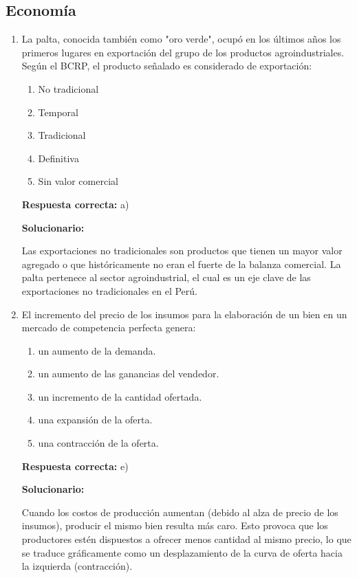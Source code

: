 \subsection*{Economía}

\begin{enumerate}[resume]

	\item La palta, conocida también como "oro verde", ocupó en los últimos años los primeros lugares en exportación del grupo de los productos agroindustriales. Según el BCRP, el producto señalado es considerado de exportación:
	\begin{enumerate}[label=\alph*)]
		\item No tradicional
		\item Temporal
		\item Tradicional
		\item Definitiva
		\item Sin valor comercial
	\end{enumerate}
	\textbf{Respuesta correcta:} a)

	\vspace{2mm}
	\textbf{Solucionario:}

	Las exportaciones no tradicionales son productos que tienen un mayor valor agregado o que históricamente no eran el fuerte de la balanza comercial. La palta pertenece al sector agroindustrial, el cual es un eje clave de las exportaciones no tradicionales en el Perú.

	\vspace{6mm}

	\item El incremento del precio de los insumos para la elaboración de un bien en un mercado de competencia perfecta genera:
	\begin{enumerate}[label=\alph*)]
		\item un aumento de la demanda.
		\item un aumento de las ganancias del vendedor.
		\item un incremento de la cantidad ofertada.
		\item una expansión de la oferta.
		\item una contracción de la oferta.
	\end{enumerate}
	\textbf{Respuesta correcta:} e)

	\vspace{2mm}
	\textbf{Solucionario:}

	Cuando los costos de producción aumentan (debido al alza de precio de los insumos), producir el mismo bien resulta más caro. Esto provoca que los productores estén dispuestos a ofrecer menos cantidad al mismo precio, lo que se traduce gráficamente como un desplazamiento de la curva de oferta hacia la izquierda (contracción).

	\vspace{6mm}

\end{enumerate}

